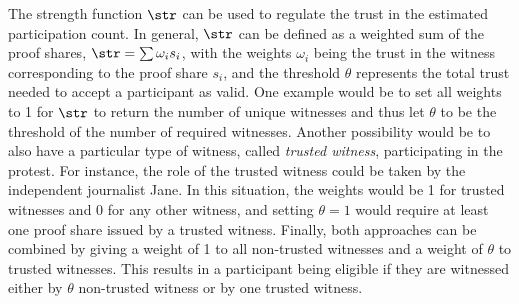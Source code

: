 The strength function \(\str\) can be used to regulate the trust in the 
estimated participation count.
In general, \(\str\) can be defined as a weighted sum of the proof shares, 
\(\str = \sum \omega_i s_i\), with the weights \(\omega_i\) being the trust in 
the witness corresponding to the proof share \(s_i\), and the threshold 
\(\theta\) represents the total trust needed to accept a participant as valid.
One example would be to set all weights to 1 for \(\str\) to return the number of unique witnesses and thus let \(\theta\) to be the threshold of the number of required witnesses.
Another possibility would be to also have a particular type of witness, called 
\emph{trusted witness}, participating in the protest. For instance, the role of 
the trusted witness could be taken by the independent journalist Jane.
In this situation, the weights would be 1 for trusted witnesses and 
0 for any other witness, and
setting \(\theta = 1\) would require at least one proof share issued by a 
trusted witness.
Finally, both approaches can be combined by giving a weight of 1 to all 
non-trusted witnesses and a weight of \(\theta\) to trusted witnesses. This 
results in a participant being eligible if they are witnessed either by \(\theta\) 
non-trusted witness or by one trusted witness.

